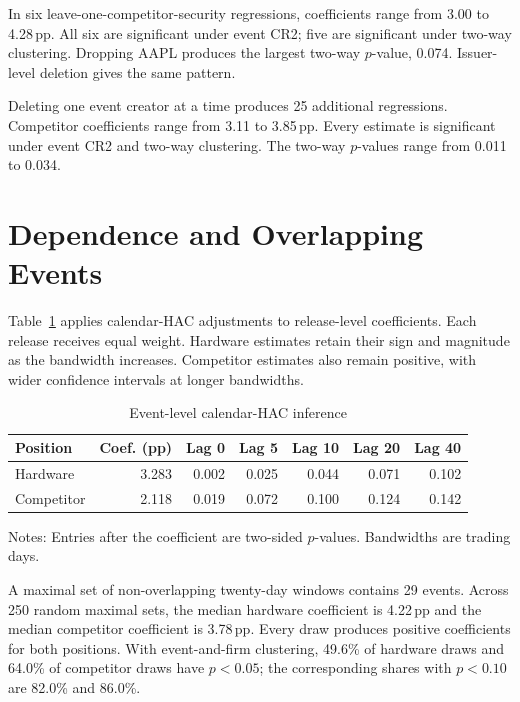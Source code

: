 \documentclass[12pt]{article}
\newcommand{\pp}{\,pp}
\begin{document}
In six leave-one-competitor-security regressions, coefficients range from
3.00 to 4.28\pp{}. All six are significant under event CR2; five are
significant under two-way clustering. Dropping AAPL produces the largest
two-way $p$-value, 0.074. Issuer-level deletion gives the same pattern.

Deleting one event creator at a time produces 25 additional regressions.
Competitor coefficients range from 3.11 to 3.85\pp{}. Every estimate is
significant under event CR2 and two-way clustering. The two-way $p$-values
range from 0.011 to 0.034.

\section{Dependence and Overlapping Events}

Table~\ref{tab:a7} applies calendar-HAC adjustments to release-level
coefficients. Each release receives equal weight. Hardware estimates retain
their sign and magnitude as the bandwidth increases. Competitor estimates
also remain positive, with wider confidence intervals at longer
bandwidths.

\begin{table}[H]
\centering
\begin{threeparttable}
\caption{Event-level calendar-HAC inference}\label{tab:a7}
\small
\setlength{\tabcolsep}{4pt}
\begin{tabular}{lrrrrrr}
\toprule
Position & Coef. (pp) & Lag 0 & Lag 5 & Lag 10 & Lag 20 & Lag 40 \\
\midrule
Hardware   & 3.283 & 0.002 & 0.025 & 0.044 & 0.071 & 0.102 \\
Competitor & 2.118 & 0.019 & 0.072 & 0.100 & 0.124 & 0.142 \\
\bottomrule
\end{tabular}
\begin{tablenotes}\footnotesize
\item Notes: Entries after the coefficient are two-sided $p$-values.
Bandwidths are trading days.
\end{tablenotes}
\end{threeparttable}
\end{table}

A maximal set of non-overlapping twenty-day windows contains 29 events.
Across 250 random maximal sets, the median hardware coefficient is
4.22\pp{} and the median competitor coefficient is 3.78\pp{}. Every
draw produces positive coefficients for both positions. With event-and-firm
clustering, 49.6\% of hardware draws and 64.0\% of competitor draws have
$p<0.05$; the corresponding shares with $p<0.10$ are 82.0\% and 86.0\%.
\end{document}
